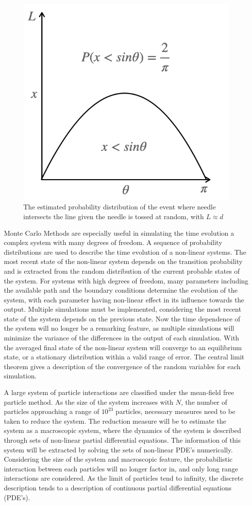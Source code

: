 \documentclass[11pt]{report}
\begin{document}
\begin{figure}[h!]
    \centering
    \includegraphics[width=.30\textwidth,clip]{pi.png}
    \caption{The estimated probability distribution of the event where needle intersects the line given the needle is tossed at random, with $L \approx d$}
    \label{pi}
\end{figure}


Monte Carlo Methods are especially useful in simulating the time evolution a complex system with many degrees of freedom. A sequence of probability distributions are used to describe the time evolution of a non-linear systems. The most recent state of the non-linear system depends on the transition probability and is extracted from the random distribution of the current probable states of the system. For systems with high degrees of freedom, many parameters including the available path and the boundary conditions determine the evolution of the system, with each parameter having non-linear effect in its influence towards the output. Multiple simulations must be implemented, considering the most recent state of the system depends on the previous state. Now the time dependence of the system will no longer be a remarking feature, as multiple simulations will minimize the variance of the differences in the output of each simulation. With the averaged final state of the non-linear system will converge to an equilibrium state, or a stationary distribution within a valid range of error. The central limit theorem gives a description of the convergence of the random variables for each simulation.

A large system of particle interactions are classified under the mean-field free particle method. As the size of the system increases with $N$, the number of particles approaching a range of $10^{23}$ particles, necessary measures need to be taken to reduce the system. The reduction measure will be to estimate the system as a macroscopic system, where the dynamics of the system is described through sets of non-linear partial differential equations. The information of this system will be extracted by solving the sets of non-linear PDE's numerically. Considering the size of the system and macroscopic feature, the probabilistic interaction between each particles will no longer factor in, and only long range interactions are considered. As the limit of particles tend to infinity, the discrete description tends to a description of continuous partial differential equations (PDE's).
\end{document}
